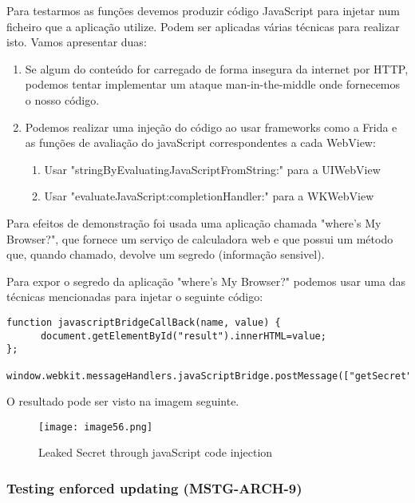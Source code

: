 Para testarmos as funções devemos produzir código JavaScript para injetar num ficheiro que a aplicação utilize. Podem ser aplicadas várias técnicas para realizar isto. Vamos apresentar duas:
\begin{enumerate}

\item Se algum do conteúdo for carregado de forma insegura da internet por HTTP, podemos tentar implementar um ataque man-in-the-middle onde fornecemos o nosso código. \par
\hfill\par

\item Podemos realizar uma injeção do código ao usar frameworks como a Frida e as funções de avaliação do javaScript correspondentes a cada WebView:
	\begin{enumerate}
		\item Usar "stringByEvaluatingJavaScriptFromString:" para a UIWebView \par
\hfill\par
		\item Usar "evaluateJavaScript:completionHandler:" para a WKWebView
	\end{enumerate}
\end{enumerate}
Para efeitos de demonstração foi usada uma aplicação chamada "where's My Browser?", que fornece um serviço de calculadora web e que possui um método que, quando chamado, devolve um segredo (informação sensivel).\par
\hfill\par
Para expor o segredo da aplicação "where's My Browser?" podemos usar uma das técnicas mencionadas para injetar o seguinte código:

\begin{lstlisting}[basicstyle=\small,]
function javascriptBridgeCallBack(name, value) {
	  document.getElementById("result").innerHTML=value;
};

window.webkit.messageHandlers.javaScriptBridge.postMessage(["getSecret"]);
\end{lstlisting}
O resultado pode ser visto na imagem seguinte.

\begin{figure}[H]
\centering
\texttt{[image: image56.png]}
\caption {Leaked Secret through javaScript code injection}
\label {fig02}
\end{figure}


\subsubsection{Testing enforced updating (MSTG-ARCH-9)}
\hfill\par
\hfill\par

